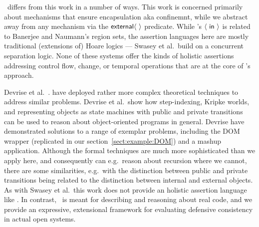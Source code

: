 \Chainmail\ differs from this work in a number of ways. This work is
concerned primarily about mechanisms that ensure encapsulation aka
confinemnt, while we abstract away from any mechanism via the
${\mathsf{external}}\langle\, \, \rangle$ predicate. While \Chainmail's $\langle\, \, \mathsf{in}\, \, \rangle$ is related to Banerjee
and Naumann's region sets, the assertion languages here are mostly
traditional (extensions of) Hoare logics --- Swasey et al.\ build on a
concurrent separation logic. None of these systems offer the kinds of
holistic assertions addressing control flow, change, or temporal
operations that are at the core of \Chainmail's approach.


Devrise et al.\ \cite{dd}. have deployed rather more complex
theoretical techniques to address similar problems.  Devrise et
al.\ show how step-indexing, Kripke worlds, and representing objects
as state machines with public and private transitions can be used to
reason about object-oriented programs in general.
Devrise have demonstrated solutions to a range of exemplar problems,
including the DOM wrapper (replicated in our
section~\ref{sect:example:DOM}) and a mashup application.
Although the formal techniques are much more sophisticated than we
apply here, and consequently can e.g.\ reason about recursion where we
cannot, there are some similarities, e.g.\ with the distinction
between public and private transitions being related to the
distinction between internal and external objects.
As with Swasey et al.\ this work does not provide an holistic
assertion language like \Chainmail.
In contrast, \Chainmail\ is
meant for describing and reasoning about real code, and we provide an
expressive, extensional framework for evaluating defensive consistency
in actual open systems.
%











